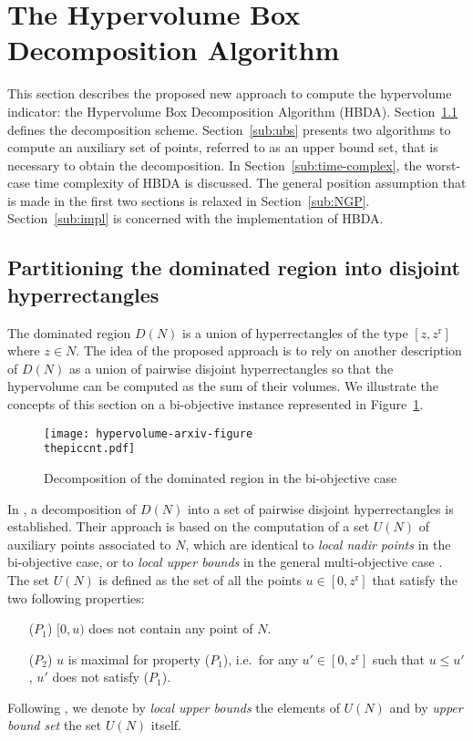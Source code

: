 \documentclass[a4paper,11pt]{article}
\newcommand{\BM}{z^{\text{r}}}
\newcommand{\Bzero}{0}
\newcommand{\lub}{local upper bound}
\newcommand{\ubs}{upper bound set}
\newcounter{piccnt}
\begin{document}
\section{The Hypervolume Box Decomposition Algorithm}\label{sec:the_approach}

This section describes the proposed new approach to compute the hypervolume indicator:
the Hypervolume Box Decomposition Algorithm (HBDA).
Section~\ref{sub:partition} defines the decomposition scheme.
Section~\ref{sub:ubs} presents two algorithms to compute an auxiliary set of points, 
referred to as an upper bound set, that is necessary to obtain the decomposition.
In Section~\ref{sub:time-complex}, the worst-case time complexity
of HBDA is discussed.
The general position assumption that is made in the first two sections is relaxed in Section~\ref{sub:NGP}.
Section~\ref{sub:impl} is concerned with the implementation of HBDA.

\subsection{Partitioning the dominated region into disjoint hyperrectangles}\label{sub:partition}

The dominated region $D(N)$ is a union of hyperrectangles 
of the type $[z, \BM]$ where $z \in N$. 
The idea of the proposed approach is to rely on another description of $D(N)$
as a union of pairwise disjoint hyperrectangles
so that the hypervolume can be computed as the sum of their volumes.
We illustrate the concepts of this section on a bi-objective instance represented 
in Figure~\ref{fig:decomp}.


\begin{figure}
  \begin{center}
    \texttt{[image: hypervolume-arxiv-figure\\thepiccnt.pdf]}
  \end{center}
  
  \caption{Decomposition of the dominated region in the bi-objective case
  \label{fig:decomp}}
\end{figure}

In \citet[Section 3]{KapRubShaVer08}, a decomposition of $D(N)$ into a set of pairwise disjoint hyperrectangles
is established.
Their approach is based on the computation of a set $U(N)$ of auxiliary points
associated to $N$, which are identical to \emph{local nadir points} in the bi-objective case,
or to \emph{local upper bounds} in the general multi-objective case \citep[see][]{KlaLacVan15}.
The set $U(N)$ is defined as the set of all the points $u \in [\Bzero, \BM]$ that satisfy
the two following properties:
\begin{itemize}[itemindent=20pt,labelsep=10pt,itemsep=\medskipamount]
      \item[($P_1$)] $[\Bzero, u)$ does not contain any point of $N$.
  \item[($P_2$)] $u$ is maximal for property ($P_1$), i.e.\  for any 
  $u' \in  [\Bzero, \BM]$ such that $u \leq u'$, $u'$ does not satisfy ($P_1$).
\end{itemize}
Following \citet{KlaLacVan15}, we denote by \emph{\lub{}s} the elements of $U(N)$
and by \emph{\ubs{}} the set $U(N)$ itself.
\end{document}
